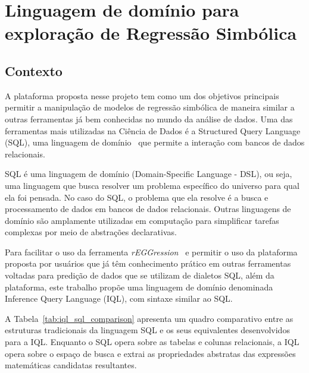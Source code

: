 \chapter{Linguagem de domínio para exploração de Regressão Simbólica}

\section{Contexto}
A plataforma proposta nesse projeto tem como um dos objetivos principais permitir a manipulação de modelos de regressão simbólica de maneira similar a outras ferramentas já bem conhecidas no mundo da análise de dados. Uma das ferramentas mais utilizadas na Ciência de Dados é a Structured Query Language (SQL), uma linguagem de domínio~\cite{sommerville2011software} que permite a interação com bancos de dados relacionais.

SQL é uma linguagem de domínio (Domain-Specific Language - DSL), ou seja, uma linguagem que busca resolver um problema específico do universo para qual ela foi pensada. No caso do SQL, o problema que ela resolve é a busca e processamento de dados em bancos de dados relacionais. Outras linguagens de domínio são amplamente utilizadas em computação para simplificar tarefas complexas por meio de abstrações declarativas.

Para facilitar o uso da ferramenta \textit{rEGGression}~\cite{rEGGression} e permitir o uso da plataforma proposta por usuários que já têm conhecimento prático em outras ferramentas voltadas para predição de dados que se utilizam de dialetos SQL, além da plataforma, este trabalho propõe uma linguagem de domínio denominada Inference Query Language (IQL), com sintaxe similar ao SQL.

A Tabela~\ref{tab:iql_sql_comparison} apresenta um quadro comparativo entre as estruturas tradicionais da linguagem SQL e os seus equivalentes desenvolvidos para a IQL. Enquanto o SQL opera sobre as tabelas e colunas relacionais, a IQL opera sobre o espaço de busca e extrai as propriedades abstratas das expressões matemáticas candidatas resultantes.

